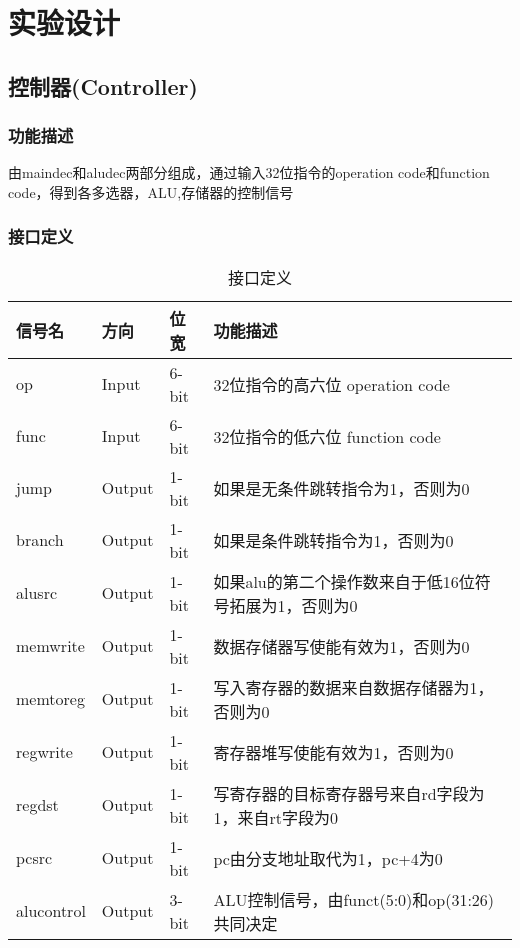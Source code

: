 \section{实验设计}

\subsection{控制器(Controller)}\label{sub:controller}

\subsubsection{功能描述}
由maindec和aludec两部分组成，通过输入32位指令的operation code和function code，得到各多选器，ALU,存储器的控制信号
\newpage
\subsubsection{接口定义}

\begin{table}[htp]
\caption{接口定义}\label{tab:signaldef}
\begin{center}
	\begin{tabular}{lllp{6cm}}
	\hline
	\textbf{信号名} & \textbf{方向} & \textbf{位宽} & \textbf{功能描述}\\ \hline
	op		& Input & 6-bit & 32位指令的高六位 operation code\\ 
	func	& Input & 6-bit & 32位指令的低六位 function  code\\
	jump    & Output& 1-bit & 如果是无条件跳转指令为1，否则为0\\
	branch  & Output& 1-bit & 如果是条件跳转指令为1，否则为0 \\
	alusrc  & Output& 1-bit & 如果alu的第二个操作数来自于低16位符号拓展为1，否则为0\\
	memwrite& Output& 1-bit & 数据存储器写使能有效为1，否则为0\\
	memtoreg& Output& 1-bit & 写入寄存器的数据来自数据存储器为1，否则为0\\
	regwrite& Output& 1-bit & 寄存器堆写使能有效为1，否则为0\\
	regdst  & Output& 1-bit & 写寄存器的目标寄存器号来自rd字段为1，来自rt字段为0\\
	pcsrc   & Output& 1-bit & pc由分支地址取代为1，pc+4为0\\
	alucontrol&Output&3-bit & ALU控制信号，由funct(5:0)和op(31:26)共同决定\\
	\hline
	\end{tabular}
\end{center}
\end{table}

